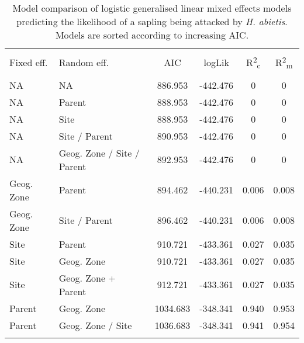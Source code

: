 
\begin{table}[!htbp] \centering 
  \caption{Model comparison of logistic generalised linear mixed effects models predicting the likelihood of a sapling being attacked by \textit{H. abietis}. Models are sorted according to increasing AIC.} 
  \label{binom_comp} 
\begin{tabular}{@{\extracolsep{5pt}} llS[table-format=3.2]S[table-format=3.2]S[table-format=3.2]S[table-format=3.2]} 
\\[-1.8ex]\hline 
\hline \\[-1.8ex] 
{Fixed eff.} & {Random eff.} & {AIC} & {logLik} & {R\textsuperscript{2}\textsubscript{c}} & {R\textsuperscript{2}\textsubscript{m}} \\
\hline \\[-1.8ex] 
NA & NA & 886.953 & -442.476 & 0 & 0 \\ 
NA & Parent & 888.953 & -442.476 & 0 & 0 \\ 
NA & Site & 888.953 & -442.476 & 0 & 0 \\ 
NA & Site / Parent & 890.953 & -442.476 & 0 & 0 \\ 
NA & Geog. Zone / Site / Parent & 892.953 & -442.476 & 0 & 0 \\ 
Geog. Zone & Parent & 894.462 & -440.231 & 0.006 & 0.008 \\ 
Geog. Zone & Site / Parent & 896.462 & -440.231 & 0.006 & 0.008 \\ 
Site & Parent & 910.721 & -433.361 & 0.027 & 0.035 \\ 
Site & Geog. Zone & 910.721 & -433.361 & 0.027 & 0.035 \\ 
Site & Geog. Zone + Parent & 912.721 & -433.361 & 0.027 & 0.035 \\ 
Parent & Geog. Zone & 1034.683 & -348.341 & 0.940 & 0.953 \\ 
Parent & Geog. Zone / Site & 1036.683 & -348.341 & 0.941 & 0.954 \\ 
\hline \\[-1.8ex] 
\end{tabular} 
\end{table} 
